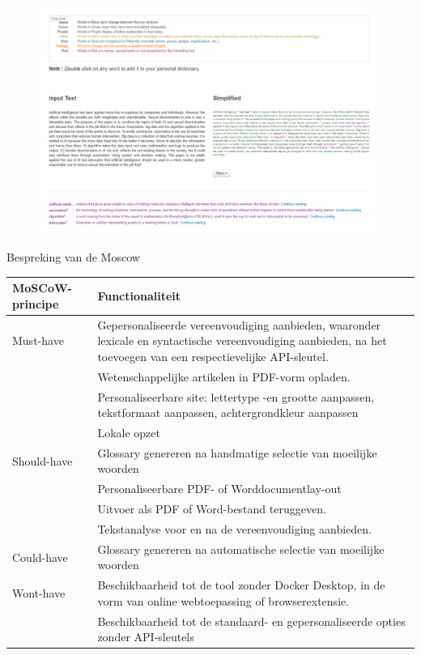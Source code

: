 \begin{figure}[H]
	\includegraphics[width=\linewidth]{img/simplish-output.png}
	\label{img:simplish-output}
\end{figure}

Bespreking van de Moscow

\begin{center}
	\begin{tabular}{ | m{4cm} | m{12cm} | } 
		\hline
		\textbf{MoSCoW-principe} & Functionaliteit \\
		\hline
		Must-have & Gepersonaliseerde vereenvoudiging aanbieden, waaronder lexicale en syntactische vereenvoudiging aanbieden, na het toevoegen van een respectievelijke API-sleutel. \\
		& Wetenschappelijke artikelen in PDF-vorm opladen. \\
		& Personaliseerbare site: lettertype -en grootte aanpassen, tekstformaat aanpassen, achtergrondkleur aanpassen \\
		& Lokale opzet \\
		\hline
		Should-have & Glossary genereren na handmatige selectie van moeilijke woorden \\
		& Personaliseerbare PDF- of Worddocumentlay-out \\
		& Uitvoer als PDF of Word-bestand teruggeven. \\
		& Tekstanalyse voor en na de vereenvoudiging aanbieden. \\
		\hline
		Could-have & Glossary genereren na automatische selectie van moeilijke woorden \\
		\hline
		Wont-have & Beschikbaarheid tot de tool zonder Docker Desktop, in de vorm van online webtoepassing of browserextensie. \\
		& Beschikbaarheid tot de standaard- en gepersonaliseerde opties zonder API-sleutels \\
		\hline
	\end{tabular}
\end{center}

